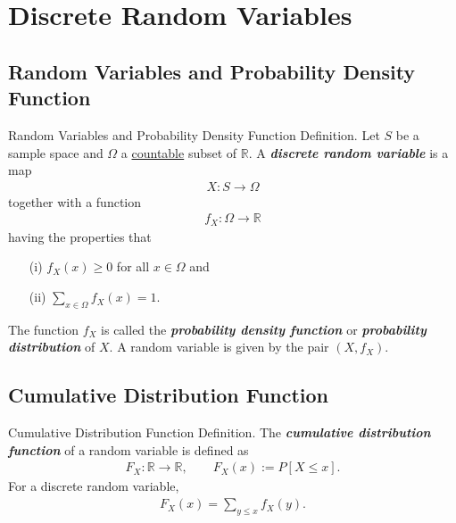 \documentclass[hyperref={pdfpagelabels=false}]{beamer}
\newcommand{\R}{\mathbb{R}}
\newcommand{\highlightg}[1]{\textcolor[rgb]{0.1,0.5,0.3}{\emph{\textbf{#1}}}}
\newcommand{\structb}[1]{\textcolor[rgb]{0.2,0.2,0.7}{#1}}
\begin{document}
\section{Discrete Random Variables}
%
\subsection{Random Variables and Probability Density Function}
\begin{frame}{Random Variables and Probability Density Function}
    \justifying
    \structb{Definition.} Let $S$ be a sample space and $\Omega$ a \underline{countable} subset of $\R$. A \highlightg{discrete random variable} is a map
    \begin{align*}
        X: S\rightarrow \Omega
    \end{align*}
    together with a function
    \begin{align*}
        f_X: \Omega \rightarrow \R
    \end{align*}
    having the properties that
    \begin{itemize}
    	\item[(i)] $f_X(x) \geq 0$ for all $x\in \Omega$ and
    	\item[(ii)] $\displaystyle \sum_{x\in \Omega} f_X(x) = 1$.
    \end{itemize}
    The function $f_X$ is called the \highlightg{probability density function} or \highlightg{probability distribution} of $X$. A random variable is given by the pair $(X, f_X)$.
\end{frame}
%
\subsection{Cumulative Distribution Function}
\begin{frame}{Cumulative Distribution Function}
    \justifying
    \structb{Definition.} The \highlightg{cumulative distribution function} of a random variable is defined as
    \begin{align*}
        F_X: \R\rightarrow \R, \qquad F_X(x) := P[X\leq x].
    \end{align*}
    For a discrete random variable,
    \begin{align*}
        F_X(x) = \sum_{y\leq x} f_X(y).
    \end{align*}
\end{frame}
%
\end{document}
